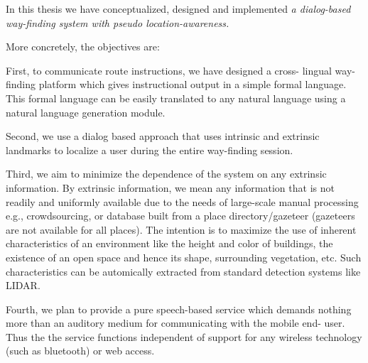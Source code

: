 \documentclass{iitkthesis}
\begin{document}
In this thesis we have conceptualized, designed and implemented
{
\textit{a dialog-based way-finding system with pseudo location-awareness.}
}

More concretely, the objectives are:

First, to communicate route instructions, we have designed a cross-
lingual way-finding platform which gives instructional output in a simple
formal language. This formal language can be easily translated to
any natural language using a natural language generation module.

Second, we use a dialog based approach that uses intrinsic and extrinsic
landmarks to localize a user during the entire way-finding session.

Third, we aim to minimize the dependence of the system on any extrinsic 
information. By extrinsic information, we mean any information that is 
not readily and uniformly available due to the needs of large-scale 
manual processing e.g., crowdsourcing, or database built from a place 
directory/gazeteer (gazeteers are not available for all places). The 
intention is to maximize the use of inherent characteristics of an 
environment like the height and color of buildings, the existence of an 
open space and hence its shape, surrounding vegetation, etc. Such 
characteristics can be automically extracted from standard detection 
systems like LIDAR.

Fourth, we plan to provide a pure speech-based service which demands 
nothing more than an auditory medium for communicating with the mobile end-
user. Thus the the service functions independent of 
support for any wireless technology (such as bluetooth) or web access.
\end{document}
